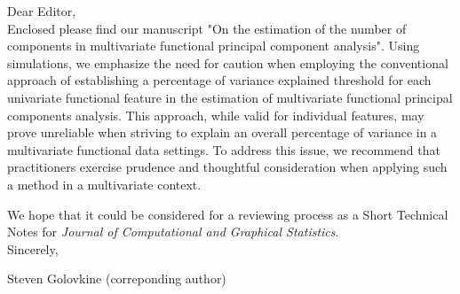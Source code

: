 \documentclass{article}
\date{\today}
\begin{document}
Dear Editor,
\\

Enclosed please find our manuscript "On the estimation of the number of components in multivariate functional principal component analysis". Using simulations, we emphasize the need for caution when employing the conventional approach of establishing a percentage of variance explained threshold for each univariate functional feature in the estimation of multivariate functional principal components analysis. This approach, while valid for individual features, may prove unreliable when striving to explain an overall percentage of variance in a multivariate functional data settings. To address this issue, we recommend that practitioners exercise prudence and thoughtful consideration when applying such a method in a multivariate context.


We hope that it could be considered for a reviewing process as a Short Technical Notes for \emph{Journal of Computational and Graphical Statistics}.
\\

Sincerely,

Steven Golovkine (correponding author)
\end{document}
